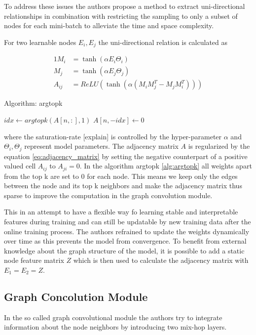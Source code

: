 \documentclass[letterpaper,twocolumn,12pt]{article}
\begin{document}
    To address these issues the authors propose a method to extract uni-directional relationships in combination with restricting the sampling
    to only a subset of nodes for each mini-batch to alleviate the time and space complexity.

    For two learnable nodes $E_i, E_j$ the uni-directional relation is calculated as

    \begin{alignat}{1}
        M_i &= \tanh (\alpha E_i \Theta_i) \\
        M_j &= \tanh (\alpha E_j \Theta_j)  \\
        A_{ij} &= ReLU(\tanh (\alpha(M_i M_j^T - M_j M_i^T))) \label{eq:adjacency_matrix}
    \end{alignat}
    \begin{algorithm}
        \caption{Algorithm: argtopk}\label{alg:argtopk}
        \begin{algorithmic}[1]
                \State $idx \gets argtopk(A[n,:], 1)$
                \State $A[n, -idx] \gets 0$
            \EndFor
        \end{algorithmic}
    \end{algorithm}
    where the saturation-rate [explain] is controlled by the hyper-parameter $\alpha$ and  $\Theta_i, \Theta_j$ represent
    model parameters. The adjacency matrix $A$ is regularized by the equation \ref{eq:adjacency_matrix}
    by setting the negative counterpart of a positive valued cell $A_{ij}$ to $A_{ji} = 0$. In the algorithm argtopk \ref{alg:argtopk}
    all weights apart from the top k are set to 0 for each node.
    This means we keep only the edges between the node and its top k neighbors and make the adjacency matrix thus sparse to improve the computation in the graph convolution module.

    This in an attempt to have a flexible way fo learning stable and interpretable features during training and can still be updatable by new training data after the online training process.
    The authors refrained to update the weights dynamically over time as this prevents the model from convergence.
    To benefit from external knowledge about the graph structure of the model, it is possible to add a static node feature matrix $Z$
    which is then used to calculate the adjacency matrix with $E_1 =  E_2 = Z $.

    \subsection{Graph Concolution Module}
    In the so called graph convolutional module the authors try to integrate information about the node neighbors by introducing two mix-hop layers.
\end{document}
